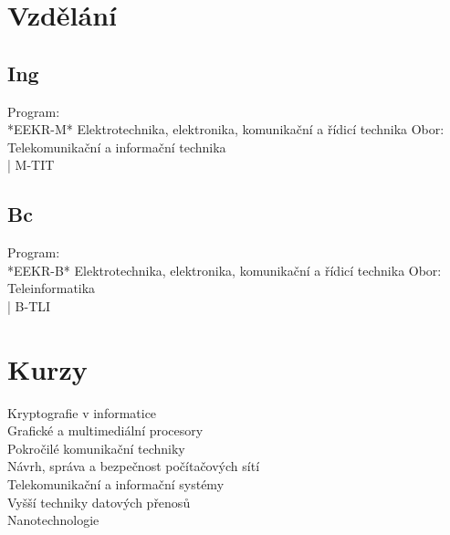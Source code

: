 \documentclass[letterpaper]{deedy-resume.cz} %
\begin{document}
\begin{minipage}[t]{0.39\textwidth} %

\section{Vzdělání} 

\subsection{Ing}
Program: \\*EEKR-M* Elektrotechnika, elektronika, komunikační a řídicí technika
Obor: \\Telekomunikační a informační technika
\\| M-TIT


\sectionspace %


\subsection{Bc}
Program: \\*EEKR-B* Elektrotechnika, elektronika, komunikační a řídicí technika
Obor: \\Teleinformatika
\\| B-TLI

\sectionspace %

\section{Kurzy}

\sectionspace %
Kryptografie v informatice \\
Grafické a multimediální procesory \\
Pokročilé komunikační techniky \\
Návrh, správa a bezpečnost počítačových sítí \\
Telekomunikační a informační systémy \\
Vyšší techniky datových přenosů \\
Nanotechnologie


\end{minipage}
\end{document}
